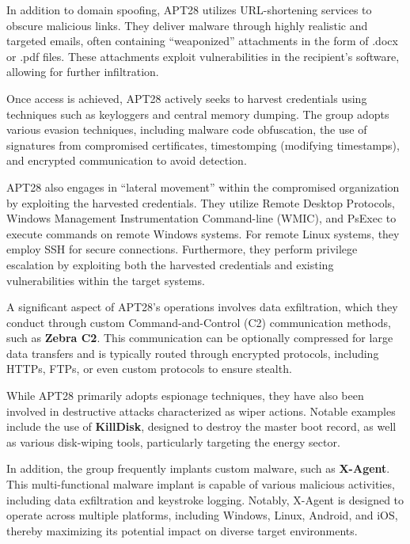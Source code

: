 In addition to domain spoofing, APT28 utilizes URL-shortening services
to obscure malicious links. They deliver malware through highly
realistic and targeted emails, often containing “weaponized”
attachments in the form of .docx or .pdf files. These attachments
exploit vulnerabilities in the recipient’s software, allowing for
further infiltration.

Once access is achieved, APT28 actively seeks to harvest credentials
using techniques such as keyloggers and central memory dumping. The
group adopts various evasion techniques, including malware code
obfuscation, the use of signatures from compromised certificates,
timestomping (modifying timestamps), and encrypted communication to
avoid detection.

APT28 also engages in “lateral movement” within the compromised
organization by exploiting the harvested credentials. They utilize
Remote Desktop Protocols, Windows Management Instrumentation
Command-line (WMIC), and PsExec to execute commands on remote Windows
systems. For remote Linux systems, they employ SSH for secure
connections. Furthermore, they perform privilege escalation by
exploiting both the harvested credentials and existing vulnerabilities
within the target systems.

A significant aspect of APT28's operations involves data exfiltration,
which they conduct through custom Command-and-Control (C2)
communication methods, such as \textbf{Zebra C2}. This communication
can be optionally compressed for large data transfers and is typically
routed through encrypted protocols, including HTTPs, FTPs, or even
custom protocols to ensure stealth.

While APT28 primarily adopts espionage techniques, they have also been
involved in destructive attacks characterized as wiper actions.
Notable examples include the use of \textbf{KillDisk}, designed to
destroy the master boot record, as well as various disk-wiping tools,
particularly targeting the energy sector.

In addition, the group frequently implants custom malware, such as
\textbf{X-Agent}. This multi-functional malware implant is capable of
various malicious activities, including data exfiltration and
keystroke logging. Notably, X-Agent is designed to operate across
multiple platforms, including Windows, Linux, Android, and iOS,
thereby maximizing its potential impact on diverse target
environments.
